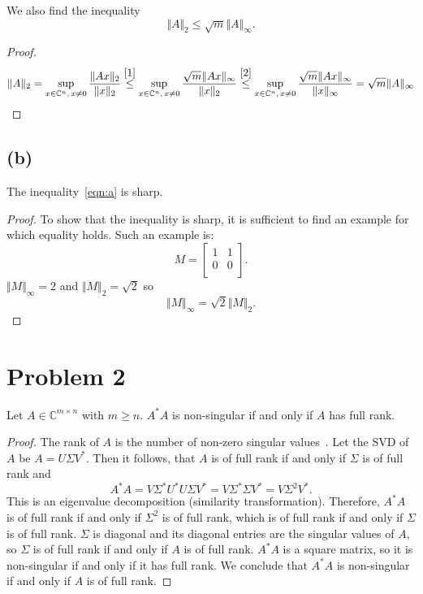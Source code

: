 \documentclass[a4paper, 11pt]{article}
\begin{document}
We also find the inequality
\begin{equation*}
  \Vert A \Vert_2 \leq \sqrt{m} \Vert A \Vert_\infty.
\end{equation*}
\begin{proof}
\begin{equation*}
  \Vert A \Vert_2 = \sup_{x \in \mathbb{C}^n,\,x \neq 0} \frac{\Vert Ax
  \Vert_2}{\Vert x \Vert_2} \stackrel{\eqref{1}}{\leq}
  \sup_{x \in \mathbb{C}^n,\,x \neq 0} \frac{\sqrt{m}\Vert Ax \Vert_\infty}{\Vert x
  \Vert_2}
  \stackrel{\eqref{2}}{\leq}
  \sup_{x \in \mathbb{C}^n,\,x \neq 0} \frac{\sqrt{m}\Vert Ax \Vert_\infty}{\Vert x
  \Vert_\infty} = \sqrt{m} \Vert A \Vert_\infty
\end{equation*}
\end{proof}

\subsection*{(b)}
The inequality~\eqref{eqn:a} is sharp.
\begin{proof}
  To show that the inequality is sharp, it is sufficient to find an example for
  which equality holds. Such an example is:
  \begin{equation*}
    M =
    \begin{bmatrix}
    1 & 1 \\
    0 & 0 \\
    \end{bmatrix}.
  \end{equation*}
  $\Vert M \Vert_\infty = 2$ and $\Vert M \Vert_2 = \sqrt{2}$ so
  \begin{equation*}
    \Vert M \Vert_\infty = \sqrt{2} \Vert M \Vert_2.
  \end{equation*}
\end{proof}

\section*{Problem 2}
Let $A \in \mathbb{C}^{m \times n}$ with $m \geq  n$. $A^{*}A$ is non-singular
if and only if $A$ has full rank.
\begin{proof}
The rank of $A$ is the number of non-zero singular values~\cite[Theorem
5.1]{tb}.  Let the SVD of $A$ be $A = U\Sigma V^*$. Then it follows, that $A$
is of full rank if and only if $\Sigma$ is of full rank and
\begin{equation*}
  A^*A = V \Sigma^* U^* U \Sigma V^* = V \Sigma^* \Sigma V^* = V \Sigma^2 V^*.
\end{equation*}
This is an eigenvalue decomposition (similarity transformation). Therefore,
$A^*A$ is of full rank if and only if $\Sigma^2$ is of full rank, which is of
full rank if and only if $\Sigma$ is of full rank. $\Sigma$ is diagonal and its
diagonal entries are the singular values of $A$,  so $\Sigma$ is of full rank
if and only if $A$ is of full rank. $A^*A$ is a square matrix, so it is
non-singular if and only if it has full rank. We conclude that $A^*A$ is
non-singular if and only if $A$ is of full rank.
\end{proof}
\end{document}
